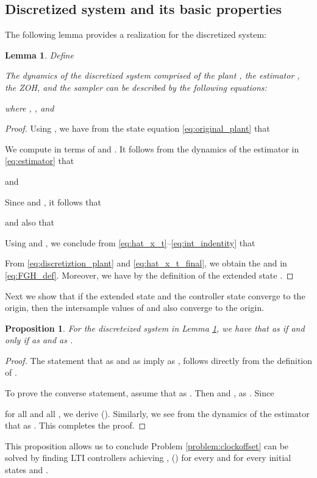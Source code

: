 \documentclass[letterpaper, 12pt, draftcls, onecolumn]{ieeeconf}
\newtheorem{proposition}[theorem]{Proposition}
\newtheorem{lemma}[theorem]{Lemma}
\begin{document}
\subsection{Discretized system and its basic properties}
The following lemma provides a realization for the discretized system:
\begin{lemma}
	\label{lem:discretization}
	Define 
	
	The dynamics of 
	the discretized system  
	comprised of the plant , the estimator , 
	the ZOH, and the sampler
	can be described by the following equations:
	
	where ,
	, and
	
\end{lemma}
\begin{proof}
	Using ,
	we have from the state equation
	\eqref{eq:original_plant} that
	
	
	We compute  in terms of  and .
	It follows from 
	the dynamics of the estimator  in \eqref{eq:estimator} that
	
	and
	
Since  and , it follows that
	
	and also that 
	
	Using  and ,
	we conclude 
from \eqref{eq:hat_x_t}--\eqref{eq:int_indentity} that
	
	
	From \eqref{eq:discretiztion_plant} and \eqref{eq:hat_x_t_final},
	we obtain the  and  in \eqref{eq:FGH_def}.
	Moreover, 
	we have 
	by the definition of the extended state . 
	\hspace*{\fill} 
\end{proof}


Next we show that if the extended state  and the controller state 
converge to the origin, then
the intersample values of  and  also converge to the origin.
\begin{proposition}
	\label{prop:stability_equivalence}
	For the discreteized system  in Lemma \ref{lem:discretization}, we have
	that  as  if and only if
	 as  and  as .
\end{proposition}
\begin{proof}
	The statement that 
	 as  and  as 
	imply 
	 as , follows directly
	from the definition of .
	
	To prove the converse statement,
	assume that  as .
	Then  and
	,  as .
	Since

	for all  and all ,
	we derive  ().
	Similarly, we see from the dynamics of the estimator  that
 as .
	This completes the proof.
	\hspace*{\fill} 
\end{proof}
This proposition allows us to conclude
Problem \ref{problem:clockoffset} can be solved by
finding LTI controllers  achieving ,  ()
for every 
and for every initial states  and .
\end{document}
